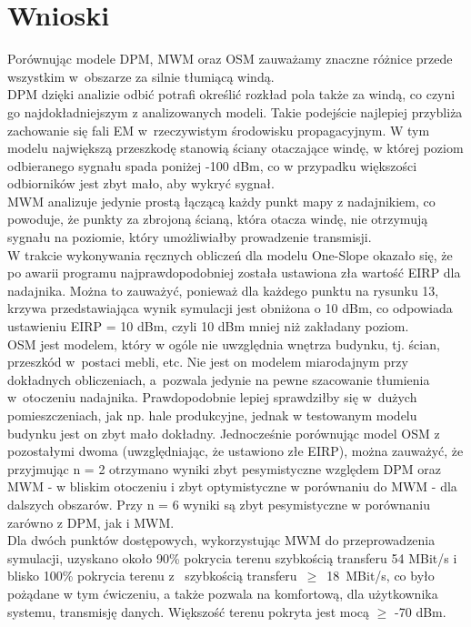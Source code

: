 \documentclass[12pt, a4paper, oneside]{article}
\begin{document}
\section{Wnioski}
\indent\indent Porównując modele DPM, MWM oraz OSM zauważamy znaczne różnice przede wszystkim w~obszarze za silnie tłumiącą windą.\\

\indent DPM dzięki analizie odbić potrafi określić rozkład pola także za windą, co czyni go najdokładniejszym z analizowanych modeli. Takie podejście najlepiej przybliża zachowanie się fali EM w~rzeczywistym środowisku propagacyjnym. W tym modelu największą przeszkodę stanowią ściany otaczające windę, w której poziom odbieranego sygnału spada poniżej -100 dBm, co w przypadku większości odbiorników jest zbyt mało, aby wykryć sygnał.\\

\indent MWM analizuje jedynie prostą łączącą każdy punkt mapy z nadajnikiem, co powoduje, że punkty za zbrojoną ścianą, która otacza windę, nie otrzymują sygnału na poziomie, który umożliwiałby prowadzenie transmisji.\\

\indent W trakcie wykonywania ręcznych obliczeń dla modelu One-Slope okazało się, że po awarii programu najprawdopodobniej została ustawiona zła wartość EIRP dla nadajnika. Można to zauważyć, ponieważ dla każdego punktu na rysunku 13, krzywa przedstawiająca wynik symulacji jest obniżona o 10 dBm, co odpowiada ustawieniu EIRP = 10 dBm, czyli 10 dBm mniej niż zakładany poziom.\\

\indent OSM jest modelem, który w ogóle nie uwzględnia wnętrza budynku, tj. ścian, przeszkód w~postaci mebli, etc. Nie jest on modelem miarodajnym przy dokładnych obliczeniach, a~pozwala jedynie na pewne szacowanie tłumienia w~otoczeniu nadajnika. Prawdopodobnie lepiej sprawdziłby się w~dużych pomieszczeniach, jak np. hale produkcyjne, jednak w testowanym modelu budynku jest on zbyt mało dokładny. Jednocześnie porównując model OSM z pozostałymi dwoma (uwzględniając, że ustawiono złe EIRP), można zauważyć, że przyjmując n = 2 otrzymano wyniki zbyt pesymistyczne względem DPM oraz MWM - w bliskim otoczeniu i zbyt optymistyczne w porównaniu do MWM - dla dalszych obszarów. Przy n = 6 wyniki są zbyt pesymistyczne w porównaniu zarówno z DPM, jak i MWM.\\

\indent Dla dwóch punktów dostępowych, wykorzystując MWM do przeprowadzenia symulacji, uzyskano około 90\% pokrycia terenu szybkością transferu 54 MBit/s i blisko 100\% pokrycia terenu z~
szybkością transferu~$\geq$~18~MBit/s, co było pożądane w tym ćwiczeniu, a także pozwala na komfortową, dla użytkownika systemu, transmisję danych. Większość terenu pokryta jest mocą $\geq$ -70 dBm.
\clearpage
\end{document}
